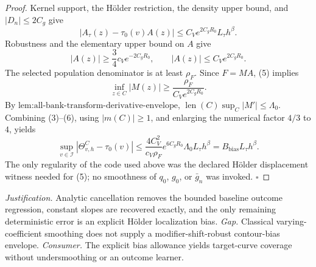 \documentclass{article}
\begin{document}
\begin{proof}
Kernel support, the H\"older restriction, the density upper bound, and \(|D_n|\le2C_g\) give
\[
 |A_\tau(z)-\tau_0(v)A(z)|
 \le C_Ve^{2C_gR_0}L_\tau h^\beta. \tag{4}
\]
Robustness and the elementary upper bound on \(A\) give
\[
 |A(z)|\ge\frac34c_Ve^{-2C_gR_0},
 \qquad |A(z)|\le C_Ve^{2C_gR_0}. \tag{5}
\]
The selected population denominator is at least \(\rho_F\).  Since \(F=MA\), (5) implies
\[
 \inf_{z\in C}|M(z)|
 \ge\frac{\rho_F}{C_Ve^{2C_gR_0}}. \tag{6}
\]
By \(\text{lem:all-bank-transform-derivative-envelope}\),
\(\operatorname{len}(C)\sup_C|M'|\le\Lambda_0\).  Combining (3)--(6), using \(|m(C)|\ge1\), and enlarging the numerical factor \(4/3\) to \(4\), yields
\[
 \sup_{v\in\mathcal I}|\Theta^C_{v,h}-\tau_0(v)|
 \le \frac{4C_V^2}{c_V\rho_F}e^{6C_gR_0}\Lambda_0
 L_\tau h^\beta
 =B_{\mathrm{bias}}L_\tau h^\beta. \tag{7}
\]
The only regularity of the code used above was the declared H\"older displacement witness needed for (5); no smoothness of \(q_0\), \(g_0\), or \(\bar g_n\) was invoked. \(\square\)
\end{proof}
\par\smallskip\noindent \textit{Justification.} Analytic cancellation removes the bounded baseline outcome regression, constant slopes are recovered exactly, and the only remaining deterministic error is an explicit Hölder localization bias. \textit{Gap.} Classical varying-coefficient smoothing does not supply a modifier-shift-robust contour-bias envelope. \textit{Consumer.} The explicit bias allowance yields target-curve coverage without undersmoothing or an outcome learner.
\end{document}
